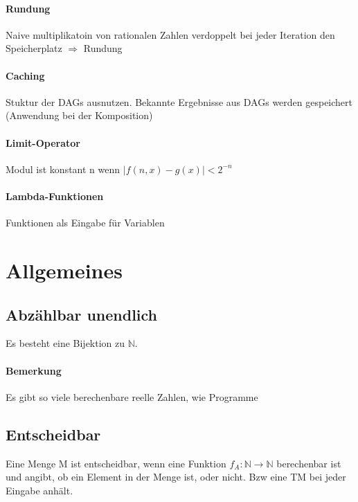 \documentclass[ngerman]{scrartcl}
\begin{document}
\paragraph{Rundung} Naive multiplikatoin von rationalen Zahlen verdoppelt bei jeder Iteration den Speicherplatz $ \Rightarrow $ Rundung

\paragraph{Caching} Stuktur der DAGs ausnutzen. Bekannte Ergebnisse aus DAGs werden gespeichert (Anwendung bei der Komposition)

\paragraph{Limit-Operator} Modul ist konstant n wenn $ |f(n,x) - g(x)| < 2^{-n} $

\paragraph{Lambda-Funktionen} Funktionen als Eingabe für Variablen

%
%
\section{Allgemeines}

\subsection{Abzählbar unendlich}
Es besteht eine Bijektion zu $ \mathbb{N} $.
\paragraph{Bemerkung} Es gibt so viele berechenbare reelle Zahlen, wie Programme

\subsection{Entscheidbar}
Eine Menge M ist entscheidbar, wenn eine Funktion $ f_A : \mathbb{N} \rightarrow \mathbb{N} $ berechenbar ist und angibt, ob ein Element in der Menge ist, oder nicht. Bzw eine TM bei jeder Eingabe anhält.
\end{document}
